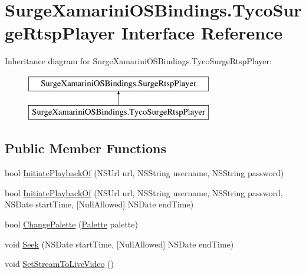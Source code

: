 \hypertarget{interface_surge_xamarini_o_s_bindings_1_1_tyco_surge_rtsp_player}{}\section{Surge\+Xamarini\+O\+S\+Bindings.\+Tyco\+Surge\+Rtsp\+Player Interface Reference}
\label{interface_surge_xamarini_o_s_bindings_1_1_tyco_surge_rtsp_player}
Inheritance diagram for Surge\+Xamarini\+O\+S\+Bindings.\+Tyco\+Surge\+Rtsp\+Player\+:\begin{figure}[H]
\begin{center}
\leavevmode
\includegraphics[height=2.000000cm]{interface_surge_xamarini_o_s_bindings_1_1_tyco_surge_rtsp_player}
\end{center}
\end{figure}
\subsection*{Public Member Functions}
\begin{DoxyCompactItemize}
\item 
bool \hyperlink{interface_surge_xamarini_o_s_bindings_1_1_tyco_surge_rtsp_player_aa61b42430a7029513095e456746e1d9d}{Initiate\+Playback\+Of} (N\+S\+Url url, N\+S\+String username, N\+S\+String password)
\item 
bool \hyperlink{interface_surge_xamarini_o_s_bindings_1_1_tyco_surge_rtsp_player_a0146485bc5d3c4453c51f855d3e4be37}{Initiate\+Playback\+Of} (N\+S\+Url url, N\+S\+String username, N\+S\+String password, N\+S\+Date start\+Time, \mbox{[}Null\+Allowed\mbox{]} N\+S\+Date end\+Time)
\item 
bool \hyperlink{interface_surge_xamarini_o_s_bindings_1_1_tyco_surge_rtsp_player_a083dfdebfaa86d4ee08524a8c563d9c0}{Change\+Palette} (\hyperlink{interface_surge_xamarini_o_s_bindings_1_1_palette}{Palette} palette)
\item 
void \hyperlink{interface_surge_xamarini_o_s_bindings_1_1_tyco_surge_rtsp_player_aab3ca153b2688584fd712842f22ea104}{Seek} (N\+S\+Date start\+Time, \mbox{[}Null\+Allowed\mbox{]} N\+S\+Date end\+Time)
\item 
void \hyperlink{interface_surge_xamarini_o_s_bindings_1_1_tyco_surge_rtsp_player_ab7c18a319cfa57aaf2b6d31507c2881c}{Set\+Stream\+To\+Live\+Video} ()
\end{DoxyCompactItemize}
